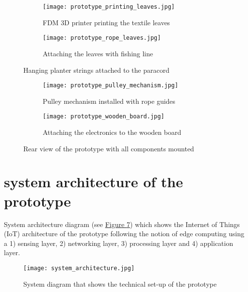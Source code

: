 \begin{appendices}
\begin{figure}[htbp]
    \centering
    \begin{subfigure}{0.48\textwidth}
        \centering
        \texttt{[image: prototype\_printing\_leaves.jpg]}
        \caption{FDM 3D printer printing the textile leaves}
        \label{fig:printing-leaves}
    \end{subfigure}
    \hfill
    \begin{subfigure}{0.48\textwidth}
        \centering
        \texttt{[image: prototype\_rope\_leaves.jpg]}
        \caption{Attaching the leaves with fishing line }
        \label{fig:attaching-leaves}
    \end{subfigure}
    \caption{Hanging planter strings attached to the paracord}
    \label{fig:prototype-leaves}
\end{figure}

\begin{figure}[htbp]
    \centering
    \begin{subfigure}{0.48\textwidth}
        \centering
        \texttt{[image: prototype\_pulley\_mechanism.jpg]}
        \caption{Pulley mechanism installed with rope guides}
        \label{fig:pulley-small}
    \end{subfigure}
    \hfill
    \begin{subfigure}{0.48\textwidth}
        \centering
        \texttt{[image: prototype\_wooden\_board.jpg]}
        \caption{Attaching the electronics to the wooden board}
        \label{fig:pulley-large}
    \end{subfigure}
    \caption{Rear view of the prototype with all components mounted}
    \label{fig:prototype-board}
\end{figure}

\section{system architecture of the prototype}
\label{appendix:architecture}

System architecture diagram (see \hyperref[fig:system-diagram]{Figure \ref{fig:system-diagram}}) which shows the Internet of Things (IoT) architecture of the prototype following the notion of edge computing using a 1) sensing layer, 2) networking layer, 3) processing layer and 4) application layer.

\begin{figure}[H]
    \centering
    \texttt{[image: system\_architecture.jpg]}
    \caption{System diagram that shows the technical set-up of the prototype}
    \label{fig:system-diagram}
\end{figure}


\end{appendices}
